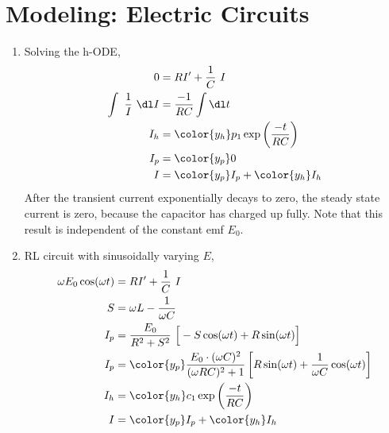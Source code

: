 \section{Modeling: Electric Circuits}

\begin{enumerate}
    \item Solving the h-ODE,
          \begin{align}
              0                         & = RI' + \frac{1}{C}\ I                                \\
              \int\  \frac{1}{I}\ \dl I & = \frac{-1}{RC}\int \dl t                             \\
              I_{h}                     & = {\color{y_h} p_{1}\exp\left( \frac{-t}{RC} \right)} \\
              I_{p}                     & = {\color{y_p} 0}                                     \\
              I                         & ={\color{y_p} I_{p}} + {\color{y_h}I_{h}}
          \end{align}
          After the transient current exponentially decays to zero, the steady state current
          is zero, because the capacitor has charged up fully. Note that this result is
          independent of the constant emf $ E_{0} $.

    \item RL circuit with sinusoidally varying $ E $,
          \begin{align}
              \omega E_{0}\cos(\omega t) & = RI' + \frac{1}{C}\ I                                                      \\
              S                          & = \omega L - \frac{1}{\omega C}                                             \\
              I_{p}                      & = \frac{E_{0}}{R^{2} + S^{2}}\ \Big[-S\cos(\omega t) + R\sin(\omega t)\Big] \\
              I_{p}                      & = {\color{y_p} \frac{E_{0} \cdot (\omega C)^{2}}{(\omega RC)^{2} + 1}
              \left[ R\sin(\omega t) + \frac{1}{\omega C} \cos(\omega t) \right]}                                      \\
              I_h                        & = {\color{y_h} c_{1} \exp\left( \frac{-t}{RC} \right)}                      \\
              I                          & ={\color{y_p} I_{p}} + {\color{y_h}I_{h}}
          \end{align}


\end{enumerate}
